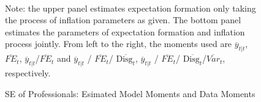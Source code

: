 \documentclass[]{article}
\begin{document}
\begin{figure}[ht]
\begin{subfigure}[b]{\textwidth}
	\end{subfigure}
	\\
	\begin{flushleft}
		{\footnotesize Note: the upper panel estimates expectation formation only taking the process of inflation parameters as given. The bottom panel estimates the parameters of expectation formation and inflation process jointly. From left to the right, the moments used are $\overline y_{t|t}$, $\overline{FE}_{t}$, $\overline y_{t|t}$/$\overline{FE}_{t}$ and $\overline y_{t|t}$ / $\overline{FE}_{t}$/ $\overline{\textrm{Disg}_t}$, $\overline y_{t|t}$ / $\overline{FE}_{t}$/ $\overline{\textrm{Disg}_t}$/$\overline{Var}_t$,  respectively. }
	\end{flushleft}
	\caption{SE of Professionals: Esimated Model Moments and Data Moments}
\end{figure}
\end{document}
